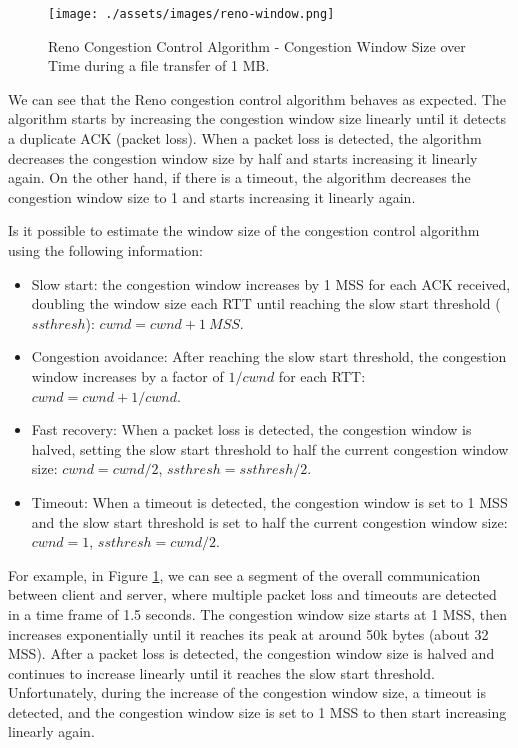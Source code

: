 \documentclass[a4paper, 11pt]{article}
\begin{document}
\begin{figure}[h]
	\centering
	\texttt{[image: ./assets/images/reno-window.png]}
	\caption{Reno Congestion Control Algorithm - Congestion Window Size over Time during a file transfer of 1 MB.}
	\label{fig:reno}
\end{figure}

We can see that the Reno congestion control algorithm behaves as expected. The algorithm starts by increasing the congestion window size linearly until it detects a duplicate ACK (packet loss). When a packet loss is detected, the algorithm decreases the congestion window size by half and starts increasing it linearly again. On the other hand, if there is a timeout, the algorithm decreases the congestion window size to 1 and starts increasing it linearly again.

Is it possible to estimate the window size of the congestion control algorithm using the following information:

\begin{itemize}
	\item Slow start: the congestion window increases by 1 MSS for each ACK received, doubling the window size each RTT until reaching the slow start threshold ($ssthresh$): $cwnd = cwnd + 1 \ MSS$.
	\item Congestion avoidance: After reaching the slow start threshold, the congestion window increases by a factor of $1/cwnd$ for each RTT: $cwnd = cwnd + 1/cwnd$.
	\item Fast recovery: When a packet loss is detected, the congestion window is halved, setting the slow start threshold to half the current congestion window size: $cwnd = cwnd / 2$, $ssthresh = ssthresh / 2$.
	\item Timeout: When a timeout is detected, the congestion window is set to 1 MSS and the slow start threshold is set to half the current congestion window size: $cwnd = 1$, $ssthresh = cwnd / 2$.
\end{itemize}

For example, in Figure \ref{fig:reno}, we can see a segment of the overall communication between client and server, where multiple packet loss and timeouts are detected in a time frame of 1.5 seconds. The congestion window size starts at 1 MSS, then increases exponentially until it reaches its peak at around 50k bytes (about 32 MSS). After a packet loss is detected, the congestion window size is halved and continues to increase linearly until it reaches the slow start threshold. Unfortunately, during the increase of the congestion window size, a timeout is detected, and the congestion window size is set to 1 MSS to then start increasing linearly again.
\end{document}
